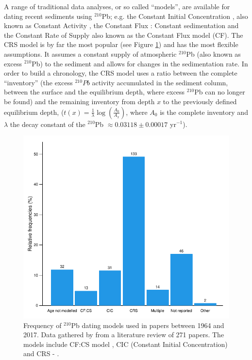 \documentclass [10pt] {article}
\begin{document}
A range of traditional data analyses, or so called ``models'', are available for dating recent sediments using $^{210}$Pb; e.g. the Constant Initial Concentration \citep[CIC,][]{Goldberg1963}, also known as Constant Activity \citep[CA,][]{Robbins1975}, the Constant Flux : Constant sedimentation \citep[CFCS,][]{Crozaz1964} and the Constant Rate of Supply  \citep[CRS,][]{Appleby1978,Robbins1978,Sanchez-Cabeza2012} also known as the Constant Flux model (CF). 
The CRS model is by far the most popular (see Figure \ref{fig:210models}) and has the most flexible assumptions. 
It assumes a constant supply of atmospheric $^{210}$Pb (also known as excess $^{210}$Pb) to the sediment and allows for changes in the sedimentation rate. 
In order to build a chronology, the CRS model uses a ratio between the complete ``inventory'' (the excess $^{210}Pb$ activity accumulated in the sediment column, between the surface and the equilibrium depth, where excess $^{210}$Pb  can no longer be found) and the remaining  inventory from depth $x$ to the previously defined equilibrium depth, ($t(x)=\frac{1}{\lambda}\log\left( \frac{A_0}{A_x}\right)$, where $A_0$ is the complete inventory and $\lambda$ the decay constant of the $^{210}$Pb $\approx 0.03118\pm 0.00017$ yr$^{-1}$).
\begin{figure}[h!]
	\begin{centering}
		\includegraphics[width=.75\linewidth]{barras.pdf}
		\caption{Frequency of $^{210}$Pb dating models used in papers between 1964 and 2017. Data gathered by \citet{Courtney2019} from a literature review of 271 papers. The models include CF:CS model \citep[The Constant Flux - Constant Sedimentation;][]{Robbins1978}, CIC (Constant Initial Concentration) \citep{Goldberg1963,Crozaz1964,Robbins1978} and CRS -  \citep[Constant Rate of Supply;][]{Appleby1978,Robbins1978}. }
		\label{fig:210models}
	\end{centering}
\end{figure}
\end{document}
